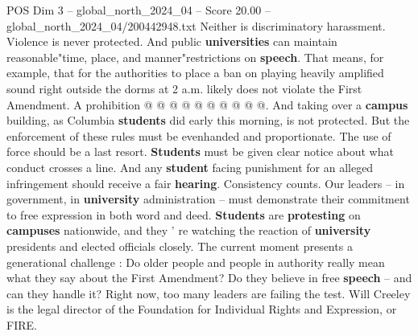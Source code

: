 \begin{textsample}{POS Dim 3 – global\_north\_2024\_04 – Score 20.00 – global\_north\_2024\_04/200442948.txt}
Neither is discriminatory harassment.
Violence is never protected.
And public \textbf{universities} can maintain reasonable"time, place, and manner"restrictions on \textbf{speech}.
That means, for example, that for the authorities to place a ban on playing heavily amplified sound right outside the dorms at 2 a.m. likely does not violate the First Amendment.
A prohibition @ @ @ @ @ @ @ @ @ @.
And taking over a \textbf{campus} building, as Columbia \textbf{students} did early this morning, is not protected.
But the enforcement of these rules must be evenhanded and proportionate.
The use of force should be a last resort. \textbf{Students} must be given clear notice about what conduct crosses a line.
And any \textbf{student} facing punishment for an alleged infringement should receive a fair \textbf{hearing}.
Consistency counts.
Our leaders -- in government, in \textbf{university} administration -- must demonstrate their commitment to free expression in both word and deed. \textbf{Students} are \textbf{protesting} on \textbf{campuses} nationwide, and they ' re watching the reaction of \textbf{university} presidents and elected officials closely.
The current moment presents a generational challenge : Do older people and people in authority really mean what they say about the First Amendment?
Do they believe in free \textbf{speech} -- and can they handle it?
Right now, too many leaders are failing the test.
Will Creeley is the legal director of the Foundation for Individual Rights and Expression, or FIRE.

\end{textsample}
